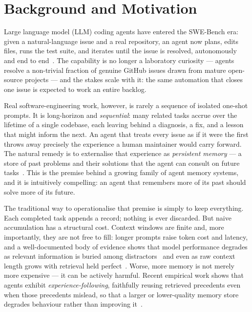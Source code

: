 

\section{Background and Motivation}

Large language model (LLM) coding agents have entered the SWE-Bench era: given a
natural-language issue and a real repository, an agent now plans, edits files, runs the
test suite, and iterates until the issue is resolved, autonomously and end to
end~\cite{joshi2025}. The capability is no longer a laboratory curiosity --- agents
resolve a non-trivial fraction of genuine GitHub issues drawn from mature open-source
projects --- and the stakes scale with it: the same automation that closes one issue is
expected to work an entire backlog.

Real software-engineering work, however, is rarely a sequence of isolated one-shot
prompts. It is long-horizon and \emph{sequential}: many related tasks accrue over the
lifetime of a single codebase, each leaving behind a diagnosis, a fix, and a lesson that
might inform the next. An agent that treats every issue as if it were the first throws
away precisely the experience a human maintainer would carry forward. The natural remedy
is to externalise that experience as \emph{persistent memory} --- a store of past
problems and their solutions that the agent can consult on future
tasks~\cite{packer2024,zhong2024}. This is the premise behind a growing family of agent
memory systems, and it is intuitively compelling: an agent that remembers more of its
past should solve more of its future.

The traditional way to operationalise that premise is simply to keep everything. Each
completed task appends a record; nothing is ever discarded. But naive accumulation has a
structural cost. Context windows are finite and, more importantly, they are not free to
fill: longer prompts raise token cost and latency, and a well-documented body of evidence
shows that model performance degrades as relevant information is buried among
distractors~\cite{liu2024} and even as raw context length grows with retrieval held
perfect~\cite{du2025}. Worse, more memory is not merely more expensive --- it can be
actively harmful. Recent empirical work shows that agents exhibit
\emph{experience-following}, faithfully reusing retrieved precedents even when those
precedents mislead, so that a larger or lower-quality memory store degrades
behaviour rather than improving it~\cite{xiong2025}.

